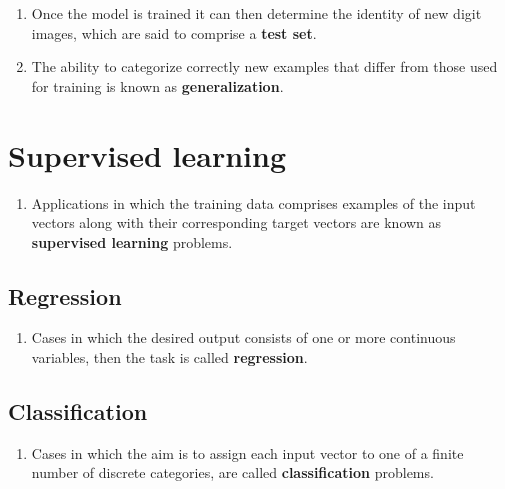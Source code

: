 \begin{enumerate}
    \item Once the model is trained it can then determine the identity of new digit images, which are said to comprise a \textbf{test set}.
    \hfill \cite{ml/book/Pattern-Recognition-And-Machine-Learning/Christopher-M-Bishop}

    \item The ability to categorize correctly new examples that differ from those used for training is known as \textbf{generalization}.
    \hfill \cite{ml/book/Pattern-Recognition-And-Machine-Learning/Christopher-M-Bishop}
\end{enumerate}





\section{Supervised learning}

\begin{enumerate}
    \item Applications in which the training data comprises examples of the input vectors along with their corresponding target vectors are known as \textbf{supervised learning} problems.
    \hfill \cite{ml/book/Pattern-Recognition-And-Machine-Learning/Christopher-M-Bishop}
\end{enumerate}



\subsection{Regression}

\begin{enumerate}
    \item Cases in which the desired output consists of one or more continuous variables, then the task is called \textbf{regression}.
    \hfill \cite{ml/book/Pattern-Recognition-And-Machine-Learning/Christopher-M-Bishop}
\end{enumerate}


\subsection{Classification}

\begin{enumerate}
    \item Cases in which the aim is to assign each input vector to one of a finite number of discrete categories, are called \textbf{classification} problems.
    \hfill \cite{ml/book/Pattern-Recognition-And-Machine-Learning/Christopher-M-Bishop}
\end{enumerate}





